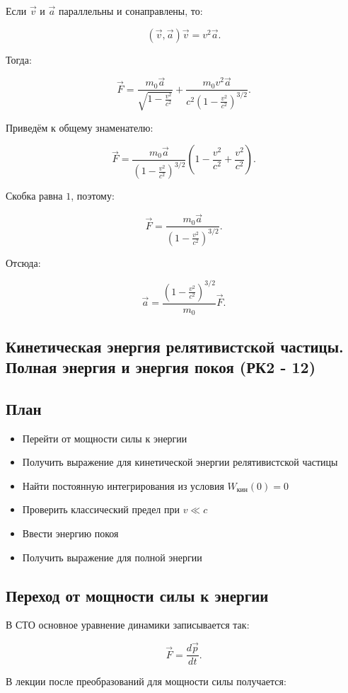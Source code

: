 \documentclass[a4paper,12pt]{article}
\begin{document}
Если $\vec v$ и $\vec a$ параллельны и сонаправлены, то:

\[
(\vec v,\vec a)\vec v = v^2\vec a.
\]

Тогда:

\[
\vec F
=
\frac{m_0\vec a}{\sqrt{1-\frac{v^2}{c^2}}}
+
\frac{m_0v^2\vec a}
{c^2\left(1-\frac{v^2}{c^2}\right)^{3/2}}.
\]

Приведём к общему знаменателю:

\[
\vec F
=
\frac{m_0\vec a}
{\left(1-\frac{v^2}{c^2}\right)^{3/2}}
\left(
1-\frac{v^2}{c^2}
+
\frac{v^2}{c^2}
\right).
\]

Скобка равна $1$, поэтому:

\[
\vec F
=
\frac{m_0\vec a}
{\left(1-\frac{v^2}{c^2}\right)^{3/2}}.
\]

Отсюда:

\[
\vec a
=
\frac{\left(1-\frac{v^2}{c^2}\right)^{3/2}}{m_0}\vec F.
\]

\subsection{Кинетическая энергия релятивистской частицы. Полная энергия и энергия покоя (РК2 - 12)}

\subsection*{План}
\begin{itemize}
\item Перейти от мощности силы к энергии
\item Получить выражение для кинетической энергии релятивистской частицы
\item Найти постоянную интегрирования из условия $W_{\text{кин}}(0)=0$
\item Проверить классический предел при $v \ll c$
\item Ввести энергию покоя
\item Получить выражение для полной энергии
\end{itemize}

\subsection*{Переход от мощности силы к энергии}

В СТО основное уравнение динамики записывается так:

\[
\vec F = \frac{d\vec p}{dt}.
\]

В лекции после преобразований для мощности силы получается:
\end{document}
